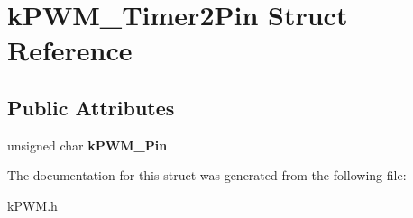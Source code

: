 \hypertarget{structkPWM__Timer2Pin}{}\section{k\+P\+W\+M\+\_\+\+Timer2\+Pin Struct Reference}
\label{structkPWM__Timer2Pin}
\subsection*{Public Attributes}
\begin{DoxyCompactItemize}
\item 
unsigned char {\bfseries k\+P\+W\+M\+\_\+\+Pin}\hypertarget{structkPWM__Timer2Pin_abea76bb1d104ee3f7718c92d508ae89f}{}\label{structkPWM__Timer2Pin_abea76bb1d104ee3f7718c92d508ae89f}

\end{DoxyCompactItemize}


The documentation for this struct was generated from the following file\+:\begin{DoxyCompactItemize}
\item 
k\+P\+W\+M.\+h\end{DoxyCompactItemize}
